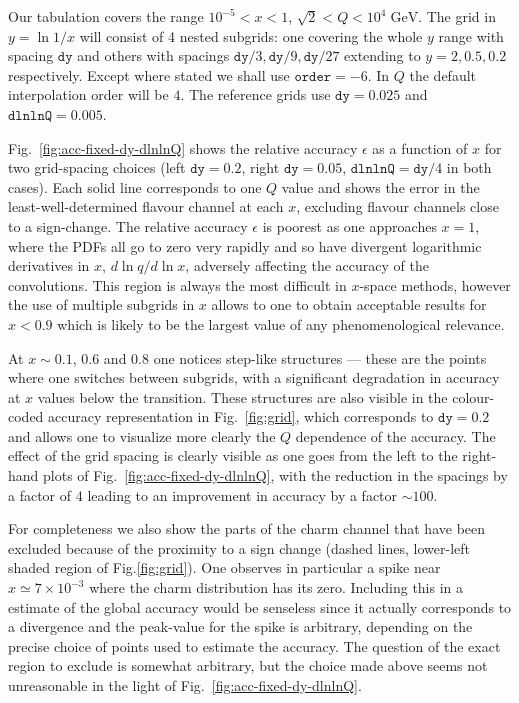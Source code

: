 \documentclass[12pt]{article}
\newcommand{\dy}{\ttt{dy}}
\newcommand{\dlnlnQ}{\ttt{dlnlnQ}}
\newcommand{\GeV}{\;\mathrm{GeV}}
\newcommand{\ttt}[1]{\texttt{#1}}
\begin{document}
Our tabulation covers the range $10^{-5}<x<1$, $\sqrt{2} < Q<
10^4\GeV$. The grid in $y=\ln1/x$ will consist of 4 nested subgrids:
one covering the whole $y$ range with spacing $\ttt{dy}$ and others
with spacings $\ttt{dy}/3, \ttt{dy}/9, \ttt{dy}/27$ extending to
$y=2,0.5,0.2$ respectively. Except where stated we shall use
$\ttt{order}=-6$. In $Q$ the default interpolation order will be $4$.
The reference grids use $\dy=0.025$ and $\dlnlnQ=0.005$.

Fig.~\ref{fig:acc-fixed-dy-dlnlnQ} shows the relative accuracy
$\epsilon$ as a function of $x$ for two grid-spacing choices (left
$\dy=0.2$, right $\dy=0.05$, $\dlnlnQ=\dy/4$ in both cases). Each
solid line corresponds to one $Q$ value and shows the error in the
least-well-determined flavour channel at each $x$, excluding flavour
channels close to a sign-change. The relative accuracy $\epsilon$
is poorest as
one approaches $x=1$, where the PDFs all go to zero very rapidly and
so have divergent logarithmic derivatives in $x$, $d\ln q/d\ln x$,
adversely affecting the accuracy of the convolutions. This region is
always the most difficult in $x$-space methods, however the use of
multiple subgrids in $x$ allows to one to obtain acceptable results
for $x<0.9$ which is likely to be the largest value of any
phenomenological relevance. 

At $x\sim0.1$, $0.6$ and $0.8$ one notices
step-like structures --- these are the points where one switches
between subgrids, with a significant degradation in accuracy at $x$
values below the transition. These structures are also visible in the
colour-coded accuracy representation in Fig.~\ref{fig:grid}, which
corresponds to $\dy=0.2$ and allows one to visualize more clearly the
$Q$ dependence of the accuracy. The effect of the grid spacing is
clearly visible as one goes from the left to the right-hand plots of
Fig.~\ref{fig:acc-fixed-dy-dlnlnQ},
with the reduction in the spacings by a factor of $4$ leading to an
improvement in accuracy by a factor $\sim 100$.



For completeness we also show the parts of the charm channel that have
been excluded because of the proximity to a sign change (dashed lines,
lower-left shaded region of Fig.\ref{fig:grid}).  One observes in
particular a spike near $x\simeq 7 \times 10^{-3}$ where the charm
distribution has its zero. Including this in a estimate of the global
accuracy would be senseless since it actually corresponds to a
divergence and the peak-value for the spike is arbitrary, depending on
the precise choice of points used to estimate the accuracy. The
question of the exact region to exclude is somewhat arbitrary, but the
choice made above seems not unreasonable in the light of
Fig.~\ref{fig:acc-fixed-dy-dlnlnQ}.
\end{document}
